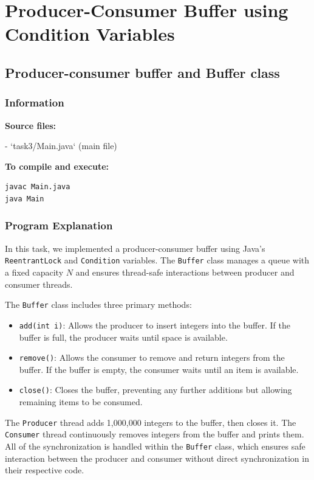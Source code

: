 \documentclass{article}
\begin{document}
\newpage
\section{Producer-Consumer Buffer using Condition Variables}

\subsection{Producer-consumer buffer and Buffer class}

\subsubsection{Information}
\textbf{Source files:}

- `task3/Main.java` (main file)

\textbf{To compile and execute:}
\begin{lstlisting}[style=bash]
javac Main.java
java Main
\end{lstlisting}

\subsubsection{Program Explanation}
In this task, we implemented a producer-consumer buffer using Java's \\ \texttt{ReentrantLock} and \texttt{Condition} variables. The \texttt{Buffer} class manages a queue with a fixed capacity \(N\) and ensures thread-safe interactions between producer and consumer threads.

The \texttt{Buffer} class includes three primary methods:
\begin{itemize}
    \item \texttt{add(int i)}: Allows the producer to insert integers into the buffer. If the buffer is full, the producer waits until space is available.
    \item \texttt{remove()}: Allows the consumer to remove and return integers from the buffer. If the buffer is empty, the consumer waits until an item is available.
    \item \texttt{close()}: Closes the buffer, preventing any further additions but allowing remaining items to be consumed.
\end{itemize}

The \texttt{Producer} thread adds 1,000,000 integers to the buffer, then closes it. The \texttt{Consumer} thread continuously removes integers from the buffer and prints them. All of the synchronization is handled within the \texttt{Buffer} class, which ensures safe interaction between the producer and consumer without direct synchronization in their respective code.
\end{document}
